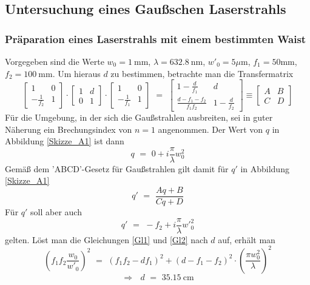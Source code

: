 \documentclass[11pt,a4paper,oneside]{scrartcl}
\begin{document}
\subsection{Untersuchung eines Gaußschen Laserstrahls}
\subsubsection{Präparation eines Laserstrahls mit einem bestimmten Waist}
Vorgegeben sind die Werte $w_0 = 1\ \mathrm{mm}$, $\lambda = 632.8\ \mathrm{nm}$, ${w'}_0 = 5 \mu \mathrm m$, $f_1 = 50\mathrm{mm}$, $f_2 = 100\ \mathrm{mm}$. Um hieraus $d$ zu bestimmen, betrachte man die Transfermatrix
\begin{equation}
\begin{bmatrix}
    1 & 0 \\
    -\frac{1}{f_2} & 1 
\end{bmatrix}
\cdot
 \begin{bmatrix}
    1 & d \\
    0 & 1 
\end{bmatrix}
\cdot
 \begin{bmatrix}
    1 & 0 \\
    -\frac{1}{f_1} & 1 
\end{bmatrix}
\,\,=\,\,
 \begin{bmatrix}
   1-\frac{d}{f_1} & d \\
    \frac{d-f_1-f_2}{f_1 f_2} & 1-\frac{d}{f_2} 
\end{bmatrix}
\equiv
 \begin{bmatrix}
   A & B \\
    C & D 
\end{bmatrix}
\end{equation}
Für die Umgebung, in der sich die Gaußstrahlen ausbreiten, sei in guter Näherung ein Brechungsindex von $n=1$ angenommen. Der Wert von $q$ in Abbildung \ref{Skizze_A1} ist dann
\begin{equation}
q \,\,=\,\, 0 + i \frac{\pi}{\lambda} w_{0}^2
\end{equation}
Gemäß dem 'ABCD'-Gesetz für Gaußstrahlen gilt damit für $q'$ in Abbildung \ref{Skizze_A1}
\begin{equation}\label{Gl1}
q' \,\,=\,\, \frac{Aq+B}{Cq+D}
\end{equation}
Für $q'$ soll aber auch
\begin{equation}\label{Gl2}
q' \,\,=\,\, -f_2 + i \frac{\pi}{\lambda} {w'}_{0}^{2}
\end{equation}
gelten. Löst man die Gleichungen \ref{Gl1} und \ref{Gl2} nach $d$ auf, erhält man
\begin{equation}
\left( f_1 f_2 \frac{w_0}{{w'}_{0}} \right)^2 \,\,=\,\, \left( f_1 f_2 - d f_1 \right)^2 + \left( d - f_1 - f_2 \right)^2 \cdot \left(\frac{\pi w_{0}^{2}}{\lambda} \right)^2
\end{equation}
\begin{equation}
\Rightarrow \,\,\,\, d \,\,=\,\, 35.15\ \mathrm{cm}
\end{equation}
\end{document}
